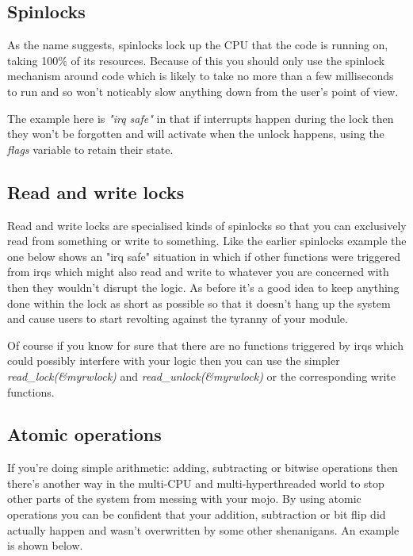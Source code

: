 \documentclass[10pt, oneside]{book}
\begin{document}

\subsection{Spinlocks}
\label{sec:orgba9012b}
As the name suggests, spinlocks lock up the CPU that the code is running on, taking 100\% of its resources. Because of this you should only use the spinlock mechanism around code which is likely to take no more than a few milliseconds to run and so won't noticably slow anything down from the user's point of view.

The example here is \emph{"irq safe"} in that if interrupts happen during the lock then they won't be forgotten and will activate when the unlock happens, using the \emph{flags} variable to retain their state.


\subsection{Read and write locks}
\label{sec:org136e336}
Read and write locks are specialised kinds of spinlocks so that you can exclusively read from something or write to something. Like the earlier spinlocks example the one below shows an "irq safe" situation in which if other functions were triggered from irqs which might also read and write to whatever you are concerned with then they wouldn't disrupt the logic. As before it's a good idea to keep anything done within the lock as short as possible so that it doesn't hang up the system and cause users to start revolting against the tyranny of your module.


Of course if you know for sure that there are no functions triggered by irqs which could possibly interfere with your logic then you can use the simpler  \emph{read\_lock(\&myrwlock)} and \emph{read\_unlock(\&myrwlock)} or the corresponding write functions.
\subsection{Atomic operations}
\label{sec:org65b297c}
If you're doing simple arithmetic: adding, subtracting or bitwise operations then there's another way in the multi-CPU and multi-hyperthreaded world to stop other parts of the system from messing with your mojo. By using atomic operations you can be confident that your addition, subtraction or bit flip did actually happen and wasn't overwritten by some other shenanigans. An example is shown below.
\end{document}
